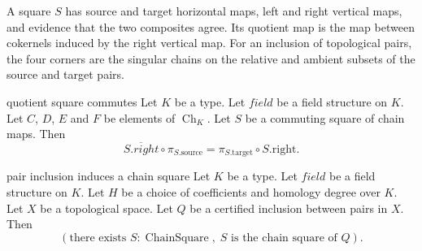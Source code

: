 A square $S$ has source and target horizontal maps, left and right vertical
maps, and evidence that the two composites agree. Its quotient map is the
map between cokernels induced by the right vertical map.
For an inclusion of topological pairs, the four corners are the singular chains
on the relative and ambient subsets of the source and target pairs.

\begin{cleanresult}{quotient square commutes}
Let $K$ be a type.
Let $\mathit{field}$ be a field structure on $K$.
Let $C$, $D$, $E$ and $F$ be elements of $\operatorname{Ch}_{K}$.
Let $S$ be a commuting square of chain maps.
Then \[\overline{S.right}\circ \pi_{S.\mathrm{source}}=\pi_{S.\mathrm{target}}\circ S.\mathrm{right}.\]
\par{}
\end{cleanresult}

\begin{cleanresult}{pair inclusion induces a chain square}
Let $K$ be a type.
Let $\mathit{field}$ be a field structure on $K$.
Let $H$ be a choice of coefficients and homology degree over $K$.
Let $X$ be a topological space.
Let $Q$ be a certified inclusion between pairs in $X$.
Then \[\left(\text{there exists }S : \operatorname{ChainSquare},\; S\text{ is the chain square of }Q\right).\]
\end{cleanresult}

